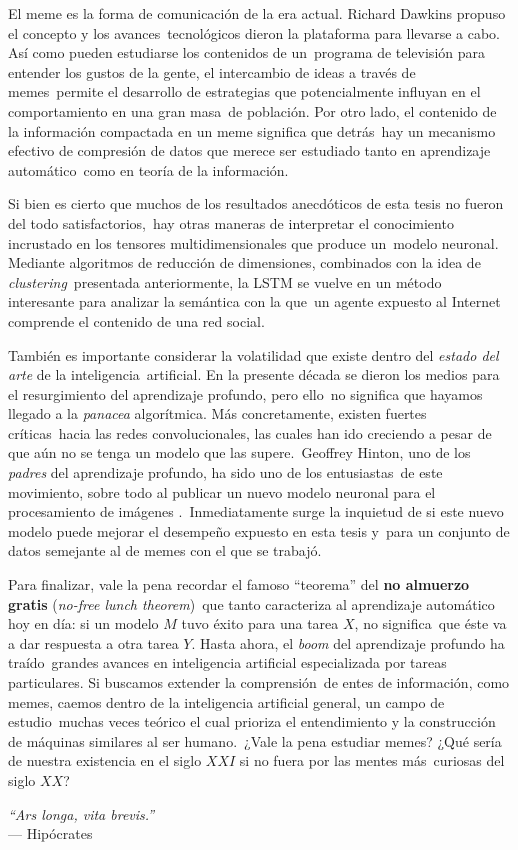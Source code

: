 El meme es la forma de comunicación de la era actual. Richard Dawkins propuso el concepto y los avances\
tecnológicos dieron la plataforma para llevarse a cabo. Así como pueden estudiarse los contenidos de un\
programa de televisión para entender los gustos de la gente, el intercambio de ideas a través de memes\
permite el desarrollo de estrategias que potencialmente influyan en el comportamiento en una gran masa\
de población. Por otro lado, el contenido de la información compactada en un meme significa que detrás\
hay un mecanismo efectivo de compresión de datos que merece ser estudiado tanto en aprendizaje automático\
como en teoría de la información.\par
Si bien es cierto que muchos de los resultados anecdóticos de esta tesis no fueron del todo satisfactorios,\
hay otras maneras de interpretar el conocimiento incrustado en los tensores multidimensionales que produce un\
modelo neuronal. Mediante algoritmos de reducción de dimensiones, combinados con la idea de \emph{clustering}\
presentada anteriormente, la LSTM se vuelve en un método interesante para analizar la semántica con la que\
un agente expuesto al Internet comprende el contenido de una red social.\par
También es importante considerar la volatilidad que existe dentro del \emph{estado del arte} de la inteligencia\
artificial. En la presente década se dieron los medios para el resurgimiento del aprendizaje profundo, pero ello\
no significa que hayamos llegado a la \emph{panacea} algorítmica. Más concretamente, existen fuertes críticas\
hacia las redes convolucionales, las cuales han ido creciendo a pesar de que aún no se tenga un modelo que las supere.\
Geoffrey Hinton, uno de los \emph{padres} del aprendizaje profundo, ha sido uno de los entusiastas\
de este movimiento, sobre todo al publicar un nuevo modelo neuronal para el procesamiento de imágenes \cite{2017arXiv171009829S}.\
Inmediatamente surge la inquietud de si este nuevo modelo puede mejorar el desempeño expuesto en esta tesis y\
para un conjunto de datos semejante al de memes con el que se trabajó.\par
Para finalizar, vale la pena recordar el famoso ``teorema'' del \textbf{no almuerzo gratis} (\emph{no-free lunch theorem})\
que tanto caracteriza al aprendizaje automático hoy en día: si un modelo $M$ tuvo éxito para una tarea $X$, no significa\
que éste va a dar respuesta a otra tarea $Y$. Hasta ahora, el \emph{boom} del aprendizaje profundo ha traído\
grandes avances en inteligencia artificial especializada por tareas particulares. Si buscamos extender la comprensión\
de entes de información, como memes, caemos dentro de la inteligencia artificial general, un campo de estudio\
muchas veces teórico el cual prioriza el entendimiento y la construcción de máquinas similares al ser humano.\
¿Vale la pena estudiar memes? ¿Qué sería de nuestra existencia en el siglo $XXI$ si no fuera por las mentes más\
curiosas del siglo $XX$?\par
\begin{center}
  \emph{``Ars longa, vita brevis.''}
  \\[5pt]
  --- Hipócrates
\end{center}

\newpage
